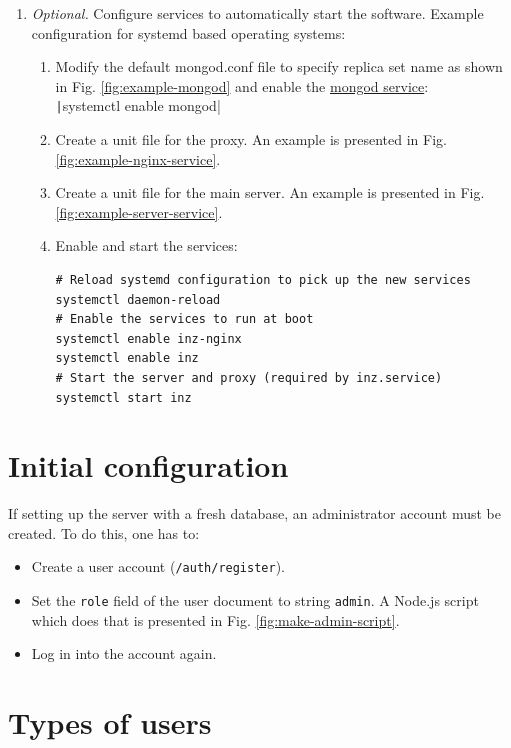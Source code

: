 \begin{enumerate}
    \item \textit{Optional.} Configure services to automatically start the software. Example configuration for systemd based operating systems:
    \begin{enumerate}
        \item Modify the default mongod.conf file to specify replica set name as shown in Fig. \ref{fig:example-mongod} and enable the \href{https://github.com/mongodb/mongo/blob/e4fff3e1fe7b31b25cedde7b05205325b47b4a7d/debian/mongod.service}{mongod service}:\\
        \texttt|systemctl enable mongod|
        \item Create a unit file for the proxy. An example is presented in Fig. \ref{fig:example-nginx-service}.
        \item Create a unit file for the main server. An example is presented in Fig. \ref{fig:example-server-service}.
        \item Enable and start the services:
        \begin{verbatim}
# Reload systemd configuration to pick up the new services
systemctl daemon-reload
# Enable the services to run at boot
systemctl enable inz-nginx
systemctl enable inz
# Start the server and proxy (required by inz.service)
systemctl start inz
        \end{verbatim}
    \end{enumerate}
\end{enumerate}

\section{Initial configuration}

If setting up the server with a fresh database, an administrator account must be created. To do this, one has to:

\begin{itemize}
    \item Create a user account (\texttt{/auth/register}).
    \item Set the \texttt{role} field of the user document to string \texttt{admin}. A Node.js script which does that is presented in Fig. \ref{fig:make-admin-script}.
    \item Log in into the account again.
\end{itemize}

\section{Types of users}
\label{chap:types-of-users}

